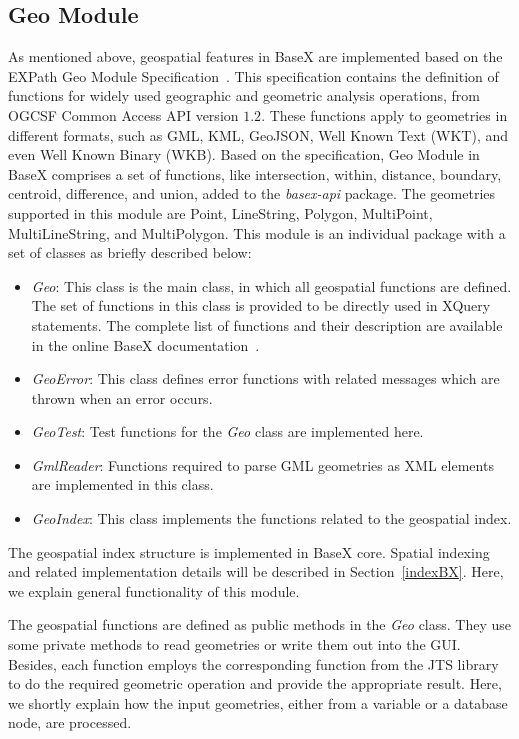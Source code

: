 \documentclass[a4paper,12pt]{article}
\begin{document}
\subsection{Geo Module}
\label{geomodule}
As mentioned above, geospatial features in BaseX are implemented based on the EXPath Geo Module Specification~\cite{expath}. This specification contains the definition of functions for widely used geographic and geometric analysis operations, from OGCSF Common Access API version $1.2$. These functions apply to geometries in different formats, such as GML, KML, GeoJSON, Well Known Text (WKT), and even Well Known Binary (WKB). Based on the specification, Geo Module in BaseX comprises a set of functions, like intersection, within, distance, boundary, centroid, difference, and union, added to the \textit{basex-api} package. The geometries supported in this module are Point, LineString, Polygon, MultiPoint, MultiLineString, and MultiPolygon. This module is an individual package with a set of classes as briefly described below:
\begin{itemize}
\item \textit{Geo}: This class is the main class, in which all geospatial functions are defined. The set of functions in this class is provided to be directly used in XQuery statements. The complete list of functions and their description are available in the online BaseX documentation~\cite{basexgeo}.
\item \textit{GeoError}: This class defines error functions with related messages which are thrown when an error occurs.
\item \textit{GeoTest}: Test functions for the \textit{Geo} class are implemented here.
\item \textit{GmlReader}: Functions required to parse GML geometries as XML elements are implemented in this class.
\item \textit{GeoIndex}: This class implements the functions related to the geospatial index. 
\end{itemize}

The geospatial index structure is implemented in BaseX core. Spatial indexing and related implementation details will be described in Section~\ref{indexBX}. Here, we explain general functionality of this module.

The geospatial functions are defined as public methods in the \textit{Geo} class. They use some private methods to read geometries or write them out into the GUI. Besides, each function employs the corresponding function from the JTS library to do the required geometric operation and provide the appropriate result. Here, we shortly explain how the input geometries, either from a variable or a database node, are processed.
\end{document}
